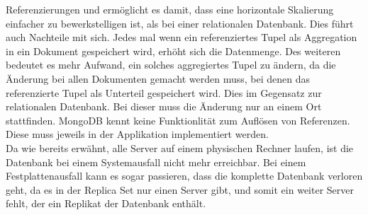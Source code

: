  Referenzierungen und ermöglicht es damit, dass eine horizontale Skalierung
 einfacher zu bewerkstelligen ist, als bei einer relationalen Datenbank. Dies
 führt auch Nachteile mit sich. Jedes mal wenn ein referenziertes
 Tupel als Aggregation in ein Dokument gespeichert wird, erhöht sich die
 Datenmenge. Des weiteren bedeutet es mehr Aufwand, ein solches aggregiertes
 Tupel zu ändern, da die Änderung bei allen Dokumenten gemacht werden muss, bei denen
 das referenzierte Tupel als Unterteil gespeichert wird. Dies im Gegensatz zur
 relationalen Datenbank. Bei dieser muss die Änderung nur an einem Ort
 stattfinden. MongoDB kennt keine Funktionlität zum Auflösen von Referenzen.
 Diese muss jeweils in der Applikation implementiert werden. \\
 Da wie bereits erwähnt, alle Server auf einem physischen Rechner
 laufen, ist die Datenbank bei einem Systemausfall nicht mehr erreichbar.
Bei einem Festplattenausfall kann es sogar passieren, dass die komplette
Datenbank verloren geht, da es in der Replica Set nur einen Server gibt, und
somit ein weiter Server fehlt, der ein Replikat der Datenbank enthält.
 